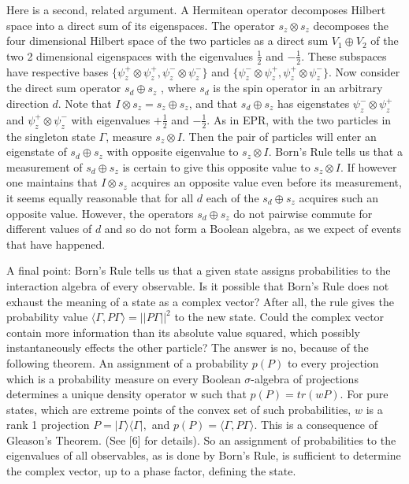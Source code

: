 \documentclass[12pt]{article}
\begin{document}
Here is a second, related argument. A Hermitean operator decomposes  Hilbert space into a direct sum of its eigenspaces. The operator $s_z\otimes s_z$ decomposes the four dimensional Hilbert space of the two particles as a direct sum $V_1\oplus V_2$ of the two 2 dimensional eigenspaces with the eigenvalues $\frac{1}{2}$ and $-\frac{1}{2}$. These subspaces have respective bases  $\{\psi_z^+\otimes \psi_z^+, \psi_z^-\otimes \psi_z^-\}$ and $\{\psi_z^-\otimes\psi_z^+, \psi_z^+\otimes \psi_z^-\}$. Now consider the direct sum operator $s_d\oplus s_z$ , where $s_d$  is the spin operator in an arbitrary direction $d$. Note that  $I\otimes s_z =  s_z\oplus s_z$, and that $s_d\oplus s_z$ has eigenstates  $\psi_z^-\otimes \psi_z^+$ and $\psi_z^+\otimes\psi_z^-$ with eigenvalues $+\frac{1}{2}$ and $-\frac{1}{2}$. As in EPR, with the two particles in the singleton state $\Gamma$, measure $s_z\otimes I$. Then the pair of particles will enter an eigenstate of $s_d\oplus s_z$ with opposite eigenvalue to $s_z\otimes I.$  Born's Rule tells us that a measurement of $s_d\oplus s_z$ is certain to give this opposite value to $s_z\otimes I.$ If however one maintains that $I\otimes s_z$ acquires an opposite value even before its measurement, it seems equally reasonable that for all $d$ each of the $s_d\oplus s_z$ acquires such an opposite value. However, the operators $s_d\oplus s_z$ do not pairwise commute for different values of $d$ and so do not form a Boolean algebra, as we expect of events that have happened.

A final point: Born's Rule tells us that a given state assigns probabilities to the interaction algebra of every observable. Is it possible that Born's Rule does not exhaust the meaning of a state as a complex vector? After all, the rule gives the probability value $\langle \Gamma,  P \Gamma \rangle  = || P\Gamma ||^2$ to the new state. Could the complex vector contain more information than its absolute value squared, which possibly instantaneously effects the other particle? The answer is no, because of the following theorem. An assignment of a probability $p(P)$ to every projection which is a probability measure on every Boolean $\sigma$-algebra of projections determines a unique density operator w such that $p(P) = tr(wP)$. For pure states, which are extreme points of the convex set of such probabilities, $w$ is a rank 1 projection $P = | \Gamma \rangle \langle\Gamma |,$ and $p(P) = \langle \Gamma, P \Gamma  \rangle .$  This is a consequence of Gleason’s Theorem. (See [6] for details).  So an assignment of probabilities to the eigenvalues of all observables, as is done by Born's Rule, is sufficient to determine the complex vector, up to a phase factor, defining the state.                                                                                                      
\end{document}
